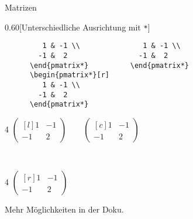 \begin{frame}[fragile]{%
  Matrizen
  \hfill
}
\begin{CodeExample}{0.60}[Unterschiedliche Ausrichtung mit \lstinline+*+]
\begin{lstlisting}
         1 & -1 \\               1 & -1 \\
        -1 &  2                 -1 &  2
      \end{pmatrix*}          \end{pmatrix*}
      \begin{pmatrix*}[r]
         1 & -1 \\
        -1 &  2
      \end{pmatrix*}
    \end{lstlisting}
  \CodeResult
    \begin{CenterStrip}{4}
      $\displaystyle
        \begin{pmatrix*}[l]
           1 & -1 \\
          -1 &  2
        \end{pmatrix*}
        \qquad
        \begin{pmatrix*}[c]
           1 & -1 \\
          -1 &  2
        \end{pmatrix*}
      $
    \end{CenterStrip} \\\nointerlineskip
    \begin{CenterStrip}{4}
      $\displaystyle
        \begin{pmatrix*}[r]
           1 & -1 \\
          -1 &  2
        \end{pmatrix*}
      $
    \end{CenterStrip}
  \end{CodeExample}
  \vspace*{-1pt}
  Mehr Möglichkeiten in der Doku.
\end{frame}

